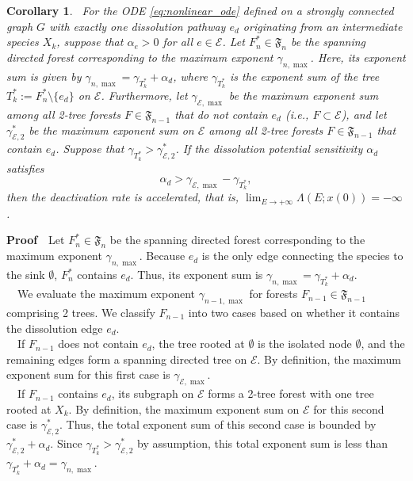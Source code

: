 \documentclass[11pt,a4paper]{article}
\newtheorem{coll}{Corollary}[section]
\begin{document}
\begin{coll}~For the ODE \eqref{eq:nonlinear_ode} defined on a strongly connected graph $G$ with exactly one dissolution pathway $e_d$ originating from an intermediate species $X_k$, suppose that $\alpha_e > 0$ for all $e \in \mathcal{E}$. Let $F_n^* \in \mathfrak{F}_n$ be the spanning directed forest corresponding to the maximum exponent $\gamma_{n, \max}$. Here, its exponent sum is given by $\gamma_{n, \max} = \gamma_{T_k^*} + \alpha_d$, where $\gamma_{T_k^*}$ is the exponent sum of the tree $T_k^* := F_n^* \setminus \{e_d\}$ on $\mathcal{E}$. Furthermore, let $\gamma_{\mathcal{E}, \max}$ be the maximum exponent sum among all 2-tree forests $F \in \mathfrak{F}_{n-1}$ that do not contain $e_d$ (i.e., $F \subset \mathcal{E}$), and let $\gamma_{\mathcal{E}, 2}^*$ be the maximum exponent sum on $\mathcal{E}$ among all 2-tree forests $F \in \mathfrak{F}_{n-1}$ that contain $e_d$. Suppose that $\gamma_{T_k^*} > \gamma_{\mathcal{E}, 2}^*$. If the dissolution potential sensitivity $\alpha_d$ satisfies
\begin{equation}
\alpha_d > \gamma_{\mathcal{E}, \max} - \gamma_{T_k^*},
\end{equation}
then the deactivation rate is accelerated, that is, $\lim_{E \to +\infty}\Lambda(E;x(0)) = -\infty$.
\end{coll}
\noindent
{\bf Proof}~~Let $F_n^* \in \mathfrak{F}_n$ be the spanning directed forest corresponding to the maximum exponent $\gamma_{n, \max}$. Because $e_d$ is the only edge connecting the species to the sink $\emptyset$, $F_n^*$ contains $e_d$. Thus, its exponent sum is $\gamma_{n, \max} = \gamma_{T_k^*} + \alpha_d$.\\
~~We evaluate the maximum exponent $\gamma_{n-1, \max}$ for forests $F_{n-1} \in \mathfrak{F}_{n-1}$ comprising 2 trees. We classify $F_{n-1}$ into two cases based on whether it contains the dissolution edge $e_d$.\\
~~If $F_{n-1}$ does not contain $e_d$, the tree rooted at $\emptyset$ is the isolated node $\emptyset$, and the remaining edges form a spanning directed tree on $\mathcal{E}$. By definition, the maximum exponent sum for this first case is $\gamma_{\mathcal{E}, \max}$.\\
~~If $F_{n-1}$ contains $e_d$, its subgraph on $\mathcal{E}$ forms a 2-tree forest with one tree rooted at $X_k$. By definition, the maximum exponent sum on $\mathcal{E}$ for this second case is $\gamma_{\mathcal{E}, 2}^*$. Thus, the total exponent sum of this second case is bounded by $\gamma_{\mathcal{E}, 2}^* + \alpha_d$. Since $\gamma_{T_k^*} > \gamma_{\mathcal{E}, 2}^*$ by assumption, this total exponent sum is less than $\gamma_{T_k^*} + \alpha_d = \gamma_{n, \max}$.\\
\end{document}
